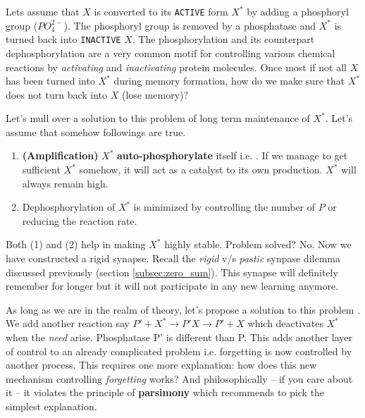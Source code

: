 \documentclass[]{resonance}
\begin{document}
Lets assume that $X$ is converted to its \texttt{ACTIVE} form $X^*$  by adding a
phosphoryl group ($PO_4^{2-}$). The phosphoryl group is removed by a phosphatase
and $X^*$ is turned back into \texttt{INACTIVE} $X$. The phosphorylation and its
counterpart dephosphorylation are a very common motif for controlling various
chemical reactions by \textit{activating} and \textit{inactivating} protein
molecules. Once most if not all $X$ has been turned into $X^*$ during
memory formation, how do we make sure that $X^*$ does not turn back into $X$
(lose memory)?

Let's mull over a solution to this problem of long term maintenance of $X^*$.
Let's assume that somehow followings are true. 
\begin{enumerate}
    \item \textbf{(Amplification)} $X^*$ \textbf{auto-phosphorylate} itself i.e. . If we manage to get sufficient $X^*$ somehow, it
        will act as a catalyst to its own production. $X^*$ will always remain
        high.
    \item Dephosphorylation of $X^*$ is minimized by controlling the number of
        $P$ or reducing the reaction rate.
\end{enumerate} 

Both (1) and (2) help in making $X^*$ highly stable. Problem solved? No.  Now
we have constructed a rigid synapse. Recall the \textit{rigid} v/s
\textit{pastic} synpase dilemma discussed previously (section
\ref{subsec:zero_sum}). This synapse will definitely remember for longer
but it will not participate in any new learning anymore.

As long as we are in the realm of theory, let's propose a solution to this
problem . We add another reaction say $P'+X^*\rightarrow P'X \rightarrow P'+X$
which deactivates $X^*$ when the \textit{need} arise. Phosphatase P' is different
than P. This adds another layer of control to an already complicated problem i.e.
forgetting is now controlled by another process. This requires one more
explanation: how does this new mechanism controlling \textit{forgetting} works?
And philosophically -- if you care about it -- it violates the principle of
\textbf{parsimony} which recommends to pick the simplest explanation.
\end{document}
